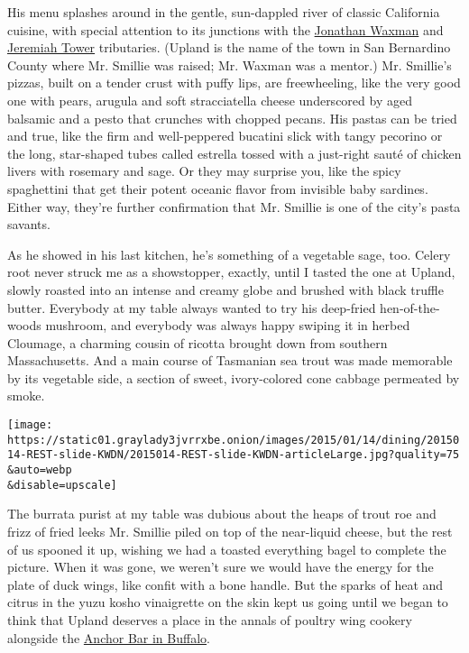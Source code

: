 His menu splashes around in the gentle, sun-dappled river of classic
California cuisine, with special attention to its junctions with the
\href{http://www.nytimes3xbfgragh.onion/2011/03/23/dining/23waxman.html?_r=0}{Jonathan
Waxman} and
\href{http://www.nytimes3xbfgragh.onion/2014/11/05/dining/tavern-on-the-green-hires-jeremiah-tower-as-head-chef.html}{Jeremiah
Tower} tributaries. (Upland is the name of the town in San Bernardino
County where Mr. Smillie was raised; Mr. Waxman was a mentor.) Mr.
Smillie's pizzas, built on a tender crust with puffy lips, are
freewheeling, like the very good one with pears, arugula and soft
stracciatella cheese underscored by aged balsamic and a pesto that
crunches with chopped pecans. His pastas can be tried and true, like the
firm and well-peppered bucatini slick with tangy pecorino or the long,
star-shaped tubes called estrella tossed with a just-right sauté of
chicken livers with rosemary and sage. Or they may surprise you, like
the spicy spaghettini that get their potent oceanic flavor from
invisible baby sardines. Either way, they're further confirmation that
Mr. Smillie is one of the city's pasta savants.

As he showed in his last kitchen, he's something of a vegetable sage,
too. Celery root never struck me as a showstopper, exactly, until I
tasted the one at Upland, slowly roasted into an intense and creamy
globe and brushed with black truffle butter. Everybody at my table
always wanted to try his deep-fried hen-of-the-woods mushroom, and
everybody was always happy swiping it in herbed Cloumage, a charming
cousin of ricotta brought down from southern Massachusetts. And a main
course of Tasmanian sea trout was made memorable by its vegetable side,
a section of sweet, ivory-colored cone cabbage permeated by smoke.

\texttt{[image: https://static01.graylady3jvrrxbe.onion/images/2015/01/14/dining/2015014-REST-slide-KWDN/2015014-REST-slide-KWDN-articleLarge.jpg?quality=75\\\&auto=webp\\\&disable=upscale]}

The burrata purist at my table was dubious about the heaps of trout roe
and frizz of fried leeks Mr. Smillie piled on top of the near-liquid
cheese, but the rest of us spooned it up, wishing we had a toasted
everything bagel to complete the picture. When it was gone, we weren't
sure we would have the energy for the plate of duck wings, like confit
with a bone handle. But the sparks of heat and citrus in the yuzu kosho
vinaigrette on the skin kept us going until we began to think that
Upland deserves a place in the annals of poultry wing cookery alongside
the
\href{http://www.nytimes3xbfgragh.onion/1981/08/30/magazine/food-winging-it-in-buffalo.html}{Anchor
Bar in Buffalo}.


